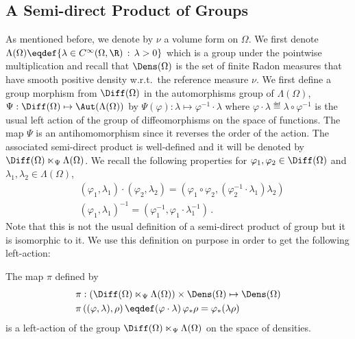 \subsection{A Semi-direct Product of Groups}
As mentioned before, we denote by $\nu$ a volume form on $\Omega$.
We first denote $\Lambda(\Omega) \eqdef \{ \lambda \in C^\infty(\Omega,\R) \, : \, \lambda > 0 \}$ which is a group under the pointwise multiplication and recall that $\Dens(\Omega)$ is the set of finite Radon measures that have smooth positive density w.r.t.\ the reference measure $\nu$.
We first define a group morphism from $\Diff(\Omega)$ in the automorphisms group of $\Lambda(\Omega) $, $\Psi : \Diff(\Omega) \mapsto \Aut(\Lambda(\Omega))$ by $\Psi(\varphi): \lambda \mapsto \varphi^{-1} \cdot \lambda  $ where $ \varphi \cdot \lambda \eqdef \lambda \circ \varphi^{-1}$ is the usual left action of the group of diffeomorphisms on the space of functions. 
The map $\Psi$ is an antihomomorphism since it reverses the order of the action. 
The associated semi-direct product is well-defined and it will be denoted by $\Diff(\Omega) \ltimes_\Psi \Lambda(\Omega)$. 
We  recall the following properties for $\varphi_1,\varphi_2 \in \Diff(\Omega)$ and $\lambda_1,\lambda_2 \in \Lambda(\Omega)$,
\begin{align}
&(\varphi_1,\lambda_1) \cdot (\varphi_2,\lambda_2) = (\varphi_1\circ \varphi_2,( \varphi_2^{-1} \cdot \lambda_1) \lambda_2 )\\
&(\varphi_1,\lambda_1)^{-1} = (\varphi_1^{-1}, \varphi_1 \cdot \lambda_1^{-1})\,.
\end{align}
Note that this is not the usual definition of a semi-direct product of group but it is isomorphic to it. We use this definition on purpose in order to get the following left-action:

\begin{proposition}
 The map $\pi$ defined by 
\begin{align*}& \pi: \left( \Diff(\Omega) \ltimes_\Psi \Lambda(\Omega) \right) \times \Dens(\Omega) \mapsto \Dens(\Omega) \\
&\pi\left((\varphi,\lambda) , \rho \right) \eqdef (\varphi \cdot \lambda) \, \varphi_*\rho = \varphi_* (\lambda \rho)
\end{align*}
is a left-action of the group $\Diff(\Omega) \ltimes_\Psi \Lambda(\Omega)$ on the space of densities.
\end{proposition}
 

